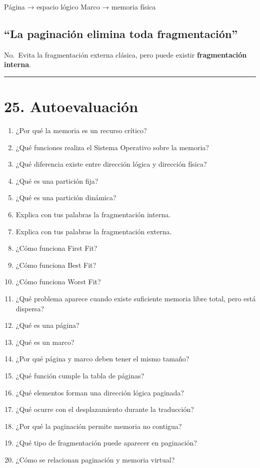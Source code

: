 \documentclass[
  spanish,
  letterpaper,
]{scrbook}
\newenvironment{Shaded}{\begin{snugshade}}{\end{snugshade}}
\newcommand{\NormalTok}[1]{\textcolor[rgb]{0.00,0.23,0.31}{#1}}
\providecommand{\tightlist}{%
  \setlength{\itemsep}{0pt}\setlength{\parskip}{0pt}}
\begin{document}
\begin{Shaded}
\begin{Highlighting}[]
\NormalTok{Página → espacio lógico}
\NormalTok{Marco  → memoria física}
\end{Highlighting}
\end{Shaded}

\section{``La paginación elimina toda
fragmentación''}\label{la-paginaciuxf3n-elimina-toda-fragmentaciuxf3n-1}

No.~Evita la fragmentación externa clásica, pero puede existir
\textbf{fragmentación interna}.

\begin{center}\rule{0.5\linewidth}{0.5pt}\end{center}


\chapter{25. Autoevaluación}\label{autoevaluaciuxf3n-8}

\begin{enumerate}
\def\labelenumi{\arabic{enumi}.}
\tightlist
\item
  ¿Por qué la memoria es un recurso crítico?
\item
  ¿Qué funciones realiza el Sistema Operativo sobre la memoria?
\item
  ¿Qué diferencia existe entre dirección lógica y dirección física?
\item
  ¿Qué es una partición fija?
\item
  ¿Qué es una partición dinámica?
\item
  Explica con tus palabras la fragmentación interna.
\item
  Explica con tus palabras la fragmentación externa.
\item
  ¿Cómo funciona First Fit?
\item
  ¿Cómo funciona Best Fit?
\item
  ¿Cómo funciona Worst Fit?
\item
  ¿Qué problema aparece cuando existe suficiente memoria libre total,
  pero está dispersa?
\item
  ¿Qué es una página?
\item
  ¿Qué es un marco?
\item
  ¿Por qué página y marco deben tener el mismo tamaño?
\item
  ¿Qué función cumple la tabla de páginas?
\item
  ¿Qué elementos forman una dirección lógica paginada?
\item
  ¿Qué ocurre con el desplazamiento durante la traducción?
\item
  ¿Por qué la paginación permite memoria no contigua?
\item
  ¿Qué tipo de fragmentación puede aparecer en paginación?
\item
  ¿Cómo se relacionan paginación y memoria virtual?
\end{enumerate}
\end{document}
